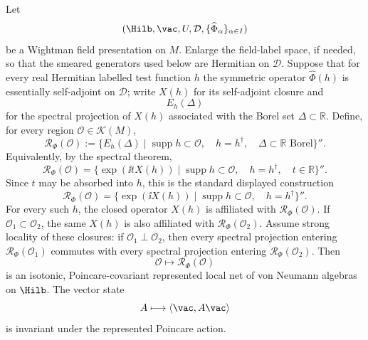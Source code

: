 \begin{theorem}
\label{thm:wightman-to-aqft-net}
Let
\[
  (\Hilb,\vac,U,\mathcal D,\{\widehat\Phi_\alpha\}_{\alpha\in I})
\]
be a Wightman field presentation on \(M\).  Enlarge the field-label space, if
needed, so that the smeared generators used below are Hermitian on
\(\mathcal D\).  Suppose that for every real Hermitian labelled test function
\(h\) the symmetric operator \(\widehat\Phi(h)\) is essentially self-adjoint on
\(\mathcal D\); write \(X(h)\) for its self-adjoint closure and
\[
  E_{h}(\Delta)
\]
for the spectral projection of \(X(h)\) associated with the Borel set
\(\Delta\subset\mathbb R\).  Define, for every region
\(\mathcal O\in\mathcal K(M)\),
\begin{equation}
  \mathcal R_\Phi(\mathcal O)
  :=
  \{E_h(\Delta)\mid
    \operatorname{supp}h\subset\mathcal O,\quad
    h=h^\dagger,\quad
    \Delta\subset\mathbb R\text{ Borel}\}'' .
  \label{eq:wightman-generated-net-from-spectral-projections}
\end{equation}
Equivalently, by the spectral theorem,
\begin{equation}
  \mathcal R_\Phi(\mathcal O)
  =
  \{\exp(\ii t X(h))\mid
    \operatorname{supp}h\subset\mathcal O,\quad
    h=h^\dagger,\quad
    t\in\mathbb R\}'' .
  \label{eq:wightman-generated-net-from-weyl-unitaries}
\end{equation}
Since \(t\) may be absorbed into \(h\), this is the standard displayed
construction
\[
  \mathcal R_\Phi(\mathcal O)
  =
  \{\exp(\ii X(h))\mid
    \operatorname{supp}h\subset\mathcal O,\quad h=h^\dagger\}'' .
\]
For every such \(h\), the closed operator \(X(h)\) is affiliated with
\(\mathcal R_\Phi(\mathcal O)\).  If
\(\mathcal O_1\subset\mathcal O_2\), the same \(X(h)\) is also affiliated with
\(\mathcal R_\Phi(\mathcal O_2)\).
Assume strong locality of these closures: if
\(\mathcal O_1\perp\mathcal O_2\), then every spectral projection entering
\(\mathcal R_\Phi(\mathcal O_1)\) commutes with every spectral projection
entering \(\mathcal R_\Phi(\mathcal O_2)\).  Then
\[
  \mathcal O\longmapsto\mathcal R_\Phi(\mathcal O)
\]
is an isotonic, Poincare-covariant represented local net of von Neumann
algebras on \(\Hilb\).  The vector state
\[
  A\longmapsto\langle\vac,A\vac\rangle
\]
is invariant under the represented Poincare action.
\end{theorem}

